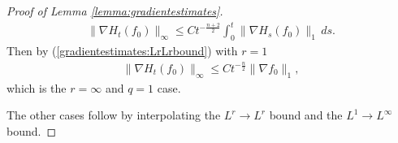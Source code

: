 \documentclass[12pt]{amsart}
\renewcommand{\1}{{\mathbf 1}}
\newtheorem{lemma}[thm]{Lemma}
\theoremstyle{others}
\numberwithin{equation}{section}
\begin{document}
\begin{proof}[Proof of Lemma \ref{lemma:gradientestimates}]
   \begin{align*}
       \|\nabla H_t(f_0)\|_\infty \leq Ct^{-\frac{n+2}{2}}\int_0^t \|\nabla H_s(f_0)\|_1 \, ds.
   \end{align*} Then by (\ref{gradientestimates:LrLrbound}) with \(r = 1\)
   \begin{align*}
       \|\nabla H_t(f_0)\|_\infty \leq Ct^{-\frac{n}{2}}\|\nabla f_0\|_1,
   \end{align*} which is the \(r = \infty\) and \(q = 1\) case. \par 
   The other cases follow by interpolating the \(L^r \to L^r\) bound and the \(L^1 \to L^\infty\) bound.
\end{proof}

  

\end{document}
